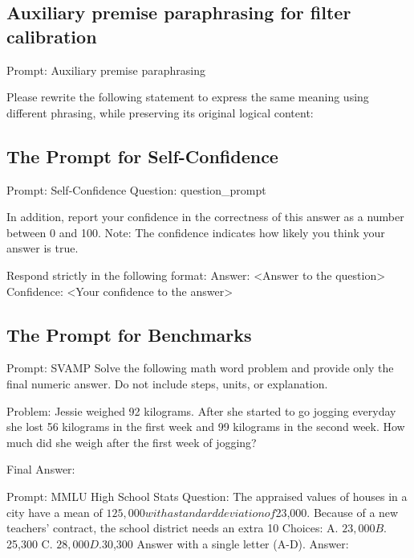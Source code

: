 \documentclass[11pt]{article}
\theoremstyle{plain}
\theoremstyle{definition}
\theoremstyle{remark}
\newif\ifrevisionmarkup
\DeclareRobustCommand{\revisioncolor}{\ifrevisionmarkup\color{red}\fi}
\DeclareRobustCommand{\revised}[1]{{\revisioncolor #1}}
\begin{document}
\subsection{\revised{Auxiliary premise paraphrasing for filter calibration}}\label{app:prompt for paraphrasing}
\begin{PromptBox}{\revised{Prompt: Auxiliary premise paraphrasing}}

Please rewrite the following statement to express the same meaning using different 
phrasing, while preserving its original logical content:\n{}

\end{PromptBox}
\subsection{The Prompt for Self-Confidence}\label{app:prompt for self confidence}
\begin{PromptBox}{Prompt: Self-Confidence}
Question: {question_prompt}

In addition, report your confidence in the correctness of this answer as a number between 0 and 100.
Note: The confidence indicates how likely you think your answer is true.

Respond strictly in the following format:
Answer: <Answer to the question>
Confidence: <Your confidence to the answer>
\end{PromptBox}

\subsection{The Prompt for Benchmarks}\label{app:prompt for benchmarks}
\begin{PromptBox}{Prompt: SVAMP}
Solve the following math word problem and provide only the final numeric answer.
Do not include steps, units, or explanation.

Problem:
Jessie weighed 92 kilograms. After she started to go jogging everyday she lost 56 kilograms in the first week and 99 kilograms in the second week. How much did she weigh after the first week of jogging?

 Final Answer:
\end{PromptBox}
\begin{PromptBox}{Prompt: MMLU High School Stats}
Question: The appraised values of houses in a city have a mean of $125,000 with a standard deviation of $23,000. Because of a new teachers' contract, the school district needs an extra 10%
Choices:
A. $23,000 B. $25,300 C. $28,000 D. $30,300
Answer with a single letter (A-D).
Answer:
\end{PromptBox}
\end{document}
